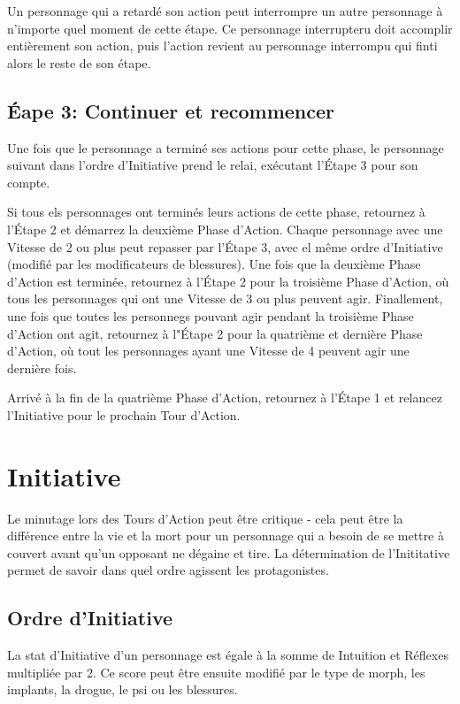 Un personnage qui a retardé son action peut interrompre un autre personnage à n'importe quel moment de cette étape. Ce personnage interrupteru doit accomplir entièrement son action, puis l'action revient au personnage interrompu qui finti alors le reste de son étape. 

\subsection{Éape 3: Continuer et recommencer} \label{sec:rotate-repeat} 

Une fois que le personnage a terminé ses actions pour cette phase, le personnage suivant dans l'ordre d'Initiative prend le relai, exécutant l'Étape 3 pour son compte. 

Si tous els personnages ont terminés leurs actions de cette phase, retournez à l'Étape 2 et démarrez la deuxième Phase d'Action. Chaque personnage avec une Vitesse de 2 ou plus peut repasser par l'Étape 3, avec el même ordre d'Initiative (modifié par les modificateurs de blessures). Une fois que la deuxième Phase d'Action est terminée, retournez à l'Étape 2 pour la troisième Phase d'Action, où tous les personnages qui ont une Vitesse de 3 ou plus peuvent agir. Finallement, une fois que toutes les personnegs pouvant agir pendant la troisième Phase d'Action ont agit, retournez à l"Étape 2 pour la quatrième et dernière Phase d'Action, où tout les personnages ayant une Vitesse de 4 peuvent agir une dernière fois. 

Arrivé à la fin de la quatrième Phase d'Action, retournez à l'Étape 1 et relancez l'Initiative pour le prochain Tour d'Action. 

\section{Initiative} \label{sec:initiative} 

Le minutage lors des Tours d'Action peut être critique - cela peut être la différence entre la vie et la mort pour un personnage qui a besoin de se mettre à couvert avant qu'un opposant ne dégaine et tire. La détermination de l'Inititative permet de savoir dans quel ordre agissent les protagonistes. 

\subsection{Ordre d'Initiative} \label{sec:initiative-order} 

La stat d'Initiative d'un personnage est égale à la somme de Intuition et Réflexes multipliée par 2. Ce score peut être ensuite modifié par le type de morph, les implants, la drogue, le psi ou les blessures. 

